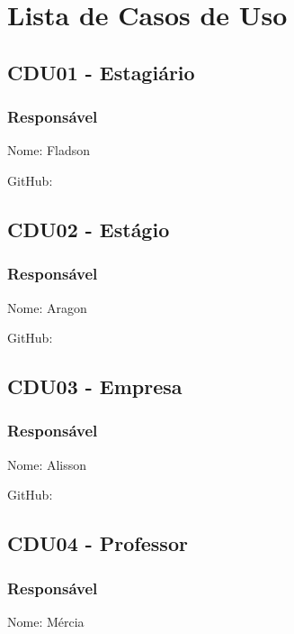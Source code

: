 \documentclass[12pt,a4paper]{report}
\begin{document}
\chapter{Lista de Casos de Uso}

\section{CDU01 - Estagiário}

\subsection{Responsável}

Nome: Fladson

GitHub:



\section{CDU02 - Estágio}

\subsection{Responsável}

Nome: Aragon

GitHub:



\section{CDU03 - Empresa}

\subsection{Responsável}

Nome: Alisson

GitHub:



\section{CDU04 - Professor}

\subsection{Responsável}

Nome: Mércia
\end{document}

